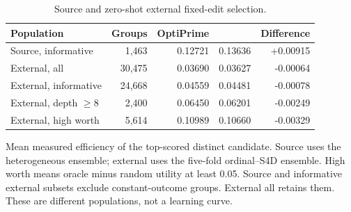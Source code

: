 \begin{table}[htbp]
\centering\small
\caption{Source and zero-shot external fixed-edit selection.}
\label{tab:decision}
\begin{tabular}{lrrrr}
\toprule
Population & Groups & OptiPrime & \model{} & Difference \\
\midrule
Source, informative & 1,463 & 0.12721 & 0.13636 & +0.00915 \\
External, all & 30,475 & 0.03690 & 0.03627 & -0.00064 \\
External, informative & 24,668 & 0.04559 & 0.04481 & -0.00078 \\
External, depth $\geq8$ & 2,400 & 0.06450 & 0.06201 & -0.00249 \\
External, high worth & 5,614 & 0.10989 & 0.10660 & -0.00329 \\
\bottomrule
\end{tabular}
\par\smallskip
\begin{minipage}{\linewidth}\footnotesize Mean measured efficiency of the top-scored distinct candidate. Source uses the heterogeneous ensemble; external uses the five-fold ordinal--S4D ensemble. High worth means oracle minus random utility at least 0.05. Source and informative external subsets exclude constant-outcome groups. External all retains them. These are different populations, not a learning curve.\end{minipage}
\end{table}
